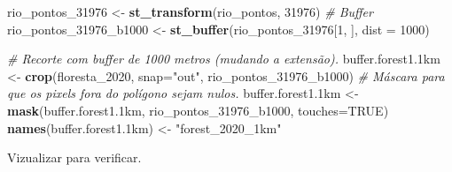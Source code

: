 \documentclass[
]{article}
\newenvironment{Shaded}{\begin{snugshade}}{\end{snugshade}}
\newcommand{\AttributeTok}[1]{\textcolor[rgb]{0.13,0.29,0.53}{#1}}
\newcommand{\CommentTok}[1]{\textcolor[rgb]{0.56,0.35,0.01}{\textit{#1}}}
\newcommand{\ConstantTok}[1]{\textcolor[rgb]{0.56,0.35,0.01}{#1}}
\newcommand{\DecValTok}[1]{\textcolor[rgb]{0.00,0.00,0.81}{#1}}
\newcommand{\FloatTok}[1]{\textcolor[rgb]{0.00,0.00,0.81}{#1}}
\newcommand{\FunctionTok}[1]{\textcolor[rgb]{0.13,0.29,0.53}{\textbf{#1}}}
\newcommand{\NormalTok}[1]{#1}
\newcommand{\OtherTok}[1]{\textcolor[rgb]{0.56,0.35,0.01}{#1}}
\newcommand{\StringTok}[1]{\textcolor[rgb]{0.31,0.60,0.02}{#1}}
\begin{document}
\begin{Shaded}
\begin{Highlighting}[]
\NormalTok{rio\_pontos\_31976 }\OtherTok{\textless{}{-}} \FunctionTok{st\_transform}\NormalTok{(rio\_pontos, }\DecValTok{31976}\NormalTok{) }
\CommentTok{\# Buffer}
\NormalTok{rio\_pontos\_31976\_b1000 }\OtherTok{\textless{}{-}} \FunctionTok{st\_buffer}\NormalTok{(rio\_pontos\_31976[}\DecValTok{1}\NormalTok{, ], }\AttributeTok{dist =} \DecValTok{1000}\NormalTok{)}

\CommentTok{\# Recorte com buffer de 1000 metros (mudando a extensão).}
\NormalTok{buffer.forest1}\FloatTok{.1}\NormalTok{km }\OtherTok{\textless{}{-}} \FunctionTok{crop}\NormalTok{(floresta\_2020, }\AttributeTok{snap=}\StringTok{"out"}\NormalTok{, rio\_pontos\_31976\_b1000)}
\CommentTok{\# Máscara para que os pixels fora do polígono sejam nulos.}
\NormalTok{buffer.forest1}\FloatTok{.1}\NormalTok{km }\OtherTok{\textless{}{-}} \FunctionTok{mask}\NormalTok{(buffer.forest1}\FloatTok{.1}\NormalTok{km, rio\_pontos\_31976\_b1000, }\AttributeTok{touches=}\ConstantTok{TRUE}\NormalTok{)}
\FunctionTok{names}\NormalTok{(buffer.forest1}\FloatTok{.1}\NormalTok{km) }\OtherTok{\textless{}{-}} \StringTok{"forest\_2020\_1km"}
\end{Highlighting}
\end{Shaded}

\newpage

Vizualizar para verificar.
\end{document}
